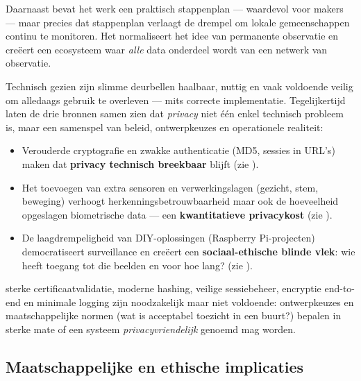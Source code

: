 \documentclass[nonacm, sigconf, balance=true]{acmart}
\begin{document}
    Daarnaast bevat het werk een praktisch stappenplan — waardevol voor makers — maar precies dat stappenplan verlaagt de drempel om lokale gemeenschappen continu te monitoren.
    Het normaliseert het idee van permanente observatie en creëert een ecosysteem waar \emph{alle} data onderdeel wordt van een netwerk van observatie.

    Technisch gezien zijn slimme deurbellen haalbaar, nuttig en vaak voldoende veilig om alledaags gebruik te overleven — mits correcte implementatie.
    Tegelijkertijd laten de drie bronnen samen zien dat \emph{privacy} niet één enkel technisch probleem is, maar een samenspel van beleid, ontwerpkeuzes en operationele realiteit:

    \begin{itemize}
        \item Verouderde cryptografie en zwakke authenticatie (MD5, sessies in URL's) maken dat \textbf{privacy technisch breekbaar} blijft (zie \parencite{liu2021ethical}).
        \item Het toevoegen van extra sensoren en verwerkingslagen (gezicht, stem, beweging) verhoogt herkenningsbetrouwbaarheid maar ook de hoeveelheid opgeslagen biometrische data — een \textbf{kwantitatieve privacykost} (zie \parencite{chaudhari2020smart}).
        \item De laagdrempeligheid van DIY-oplossingen (Raspberry Pi-projecten) democratiseert surveillance en creëert een \textbf{sociaal-ethische blinde vlek}: wie heeft toegang tot die beelden en voor hoe lang? (zie \parencite{lalitha2019smart}).
    \end{itemize}

    sterke certificaatvalidatie, moderne hashing, veilige sessiebeheer, encryptie end-to-end en minimale logging zijn noodzakelijk maar niet voldoende: ontwerpkeuzes en maatschappelijke normen (wat is acceptabel toezicht in een buurt?) bepalen in sterke mate of een systeem \emph{privacyvriendelijk} genoemd mag worden.

    \subsection{Maatschappelijke en ethische implicaties}\label{subsec:maatschappelijke-en-ethische-implicaties}
\end{document}
